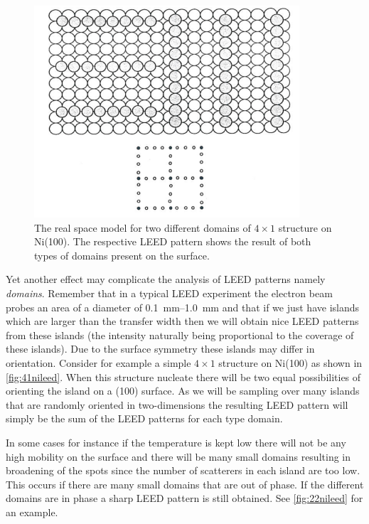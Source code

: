\begin{figure}[h!]
	\begin{center}
	\includegraphics[scale=4]{figures/09_13.png}
	\caption{The real space model for two different domains of $4\times 1$ structure on Ni(100). The respective LEED pattern shows the result of both types of domains present on the surface.}
	\label{fig:41nileed}
	\end{center}
\end{figure}

Yet another effect may complicate the analysis of LEED patterns namely \emph{domains}. Remember that in a typical LEED experiment the electron beam probes an area of a diameter of \SIrange{0.1}{1.0}{mm} and that if we just have islands which are larger than the transfer width then we will obtain nice LEED patterns from these islands (the intensity naturally being proportional to the coverage of these islands). Due to the surface symmetry these islands may differ in orientation. Consider for example a simple $4\times 1$ structure on Ni(100) as shown in \autoref{fig:41nileed}. When this structure nucleate there will be two equal possibilities of orienting the island on a (100) surface. As we will be sampling over many islands that are randomly oriented in two-dimensions the resulting LEED pattern will simply be the sum of the LEED patterns for each type domain.

In some cases for instance if the temperature is kept low there will not be any high mobility on the surface and there will be many small domains resulting in broadening of the spots since the number of scatterers in each island are too low. This occurs if there are many small domains that are out of phase. If the different domains are in phase a sharp LEED pattern is still obtained. See \autoref{fig:22nileed} for an example.

